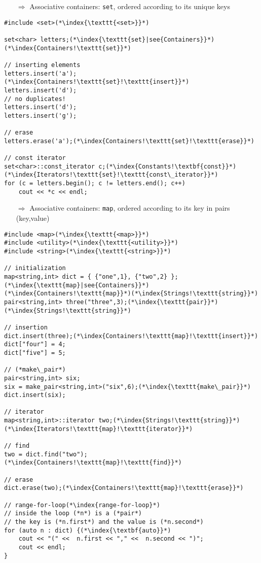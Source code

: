 \documentclass[10pt]{book}
\begin{document}
\begin{enumerate}
\item[$\Rightarrow$] Associative containers: \texttt{set}, ordered according to its unique keys
\end{enumerate}
\begin{lstlisting}
#include <set>(*\index{\texttt{<set>}}*)

set<char> letters;(*\index{\texttt{set}|see{Containers}}*)(*\index{Containers!\texttt{set}}*)

// inserting elements    
letters.insert('a');(*\index{Containers!\texttt{set}!\texttt{insert}}*)
letters.insert('d');
// no duplicates!
letters.insert('d');
letters.insert('g');

// erase    
letters.erase('a');(*\index{Containers!\texttt{set}!\texttt{erase}}*)

// const iterator 
set<char>::const_iterator c;(*\index{Constants!\textbf{const}}*)(*\index{Iterators!\texttt{set}!\texttt{const\_iterator}}*)
for (c = letters.begin(); c != letters.end(); c++)
    cout << *c << endl;
\end{lstlisting}
\begin{enumerate}
\item[$\Rightarrow$] Associative containers: \texttt{map}, ordered according to its key in pairs (key,value)
\end{enumerate}
\begin{lstlisting}
#include <map>(*\index{\texttt{<map>}}*)
#include <utility>(*\index{\texttt{<utility>}}*)
#include <string>(*\index{\texttt{<string>}}*)

// initialization
map<string,int> dict = { {"one",1}, {"two",2} };(*\index{\texttt{map}|see{Containers}}*)(*\index{Containers!\texttt{map}}*)(*\index{Strings!\texttt{string}}*)
pair<string,int> three("three",3);(*\index{\texttt{pair}}*)(*\index{Strings!\texttt{string}}*)

// insertion    
dict.insert(three);(*\index{Containers!\texttt{map}!\texttt{insert}}*)
dict["four"] = 4;
dict["five"] = 5;

// (*make\_pair*)
pair<string,int> six;
six = make_pair<string,int>("six",6);(*\index{\texttt{make\_pair}}*)
dict.insert(six);

// iterator    
map<string,int>::iterator two;(*\index{Strings!\texttt{string}}*)(*\index{Iterators!\texttt{map}!\texttt{iterator}}*)

// find    
two = dict.find("two");(*\index{Containers!\texttt{map}!\texttt{find}}*)

// erase    
dict.erase(two);(*\index{Containers!\texttt{map}!\texttt{erase}}*)

// range-for-loop(*\index{range-for-loop}*)
// inside the loop (*n*) is a (*pair*)
// the key is (*n.first*) and the value is (*n.second*)
for (auto n : dict) {(*\index{\textbf{auto}}*)
    cout << "(" <<  n.first << "," <<  n.second << ")";
    cout << endl;
}
\end{lstlisting}
\end{document}
